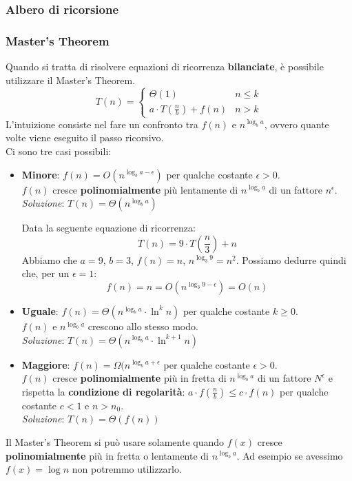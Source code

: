 \subsubsection{Albero di ricorsione}
\subsubsection{Master's Theorem}
Quando si tratta di risolvere equazioni di ricorrenza \textbf{bilanciate}, è possibile utilizzare il Master's Theorem. \\
\begin{equation}
	T(n)=\begin{cases}
		\Theta(1) & n \leq k \\
		a \cdot T(\frac{n}{b}) + f(n) & n >k
	\end{cases}
\end{equation}
L'intuizione consiste nel fare un confronto tra $f(n)$ e $n^{\log_b{a}}$, ovvero quante volte viene eseguito il passo ricorsivo. \\
Ci sono tre casi possibili:
\begin{itemize}
	\item \textbf{Minore}: $f(n) = O(n^{\log_b{a}-\epsilon})$ per qualche costante $\epsilon > 0$. \\ $f(n)$ cresce \textbf{polinomialmente} più lentamente di $n^{\log_b{a}}$ di un fattore $n^\epsilon$. \\
	\emph{Soluzione}: $T(n) = \Theta(n^{\log_b{a}})$ \\
	\begin{example}
		Data la seguente equazione di ricorrenza:
		\begin{equation}
			T(n) = 9 \cdot T(\frac{n}{3}) + n
		\end{equation}
		Abbiamo che $a=9$, $b=3$, $f(n) = n$, $n^{\log_3 9} = n^2$. Possiamo dedurre quindi che, per un $\epsilon = 1$:
		\begin{equation}
			f(n)  = n = O(n^{\log_3 9 - \epsilon}) = O(n)
		\end{equation}
	\end{example}
	\item \textbf{Uguale}: $f(n) = \Theta(n^{\log_b{a}}\cdot \ln^k{n})$ per qualche costante $k \geq 0$. \\ $f(n)$ e $n^{\log_b{a}}$ crescono allo stesso modo. \\
	\emph{Soluzione}: $T(n) = \Theta(n^{\log_b{a}} \cdot \ln^{k+1}{n})$
	\item \textbf{Maggiore}: $f(n) = \Omega(n^{\log_b{a} + \epsilon}$ per qualche costante $\epsilon > 0$. \\ $f(n)$ cresce \textbf{polinomialmente} più in fretta di $n^{\log_b{a}}$ di un fattore $N^\epsilon$ e rispetta la \textbf{condizione di regolarità}: $a \cdot f(\frac{n}{b}) \leq c \cdot f(n)$ per qualche costante $c<1$ e $n > n_0$. \\
	\emph{Soluzione}: $T(n) = \Theta(f(n))$
\end{itemize}
\begin{observation}
	Il Master's Theorem si può usare solamente quando $f(x)$ cresce \textbf{polinomialmente} più in fretta o lentamente di $n^{\log_b{a}}$. Ad esempio se avessimo $f(x) = \log{n}$ non potremmo utilizzarlo.
\end{observation}